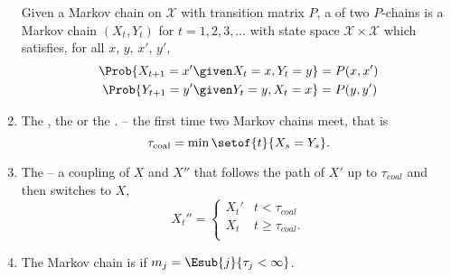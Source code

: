 \documentclass[12pt]{article}
\begin{document}
\begin{enumerate}
        Given a Markov chain on \( \mathcal{X} \) with transition matrix
        \( P \), a  of two \( P \)-chains is a
        Markov chain \( (X_t, Y_t) \) for \( t=1, 2, 3, \dots \) with
        state space \( \mathcal{X} \times \mathcal{X} \) which
        satisfies, for all \( x \), \( y \), \( x' \), \( y' \),
        \begin{align*}
            \Prob{X_{t+1} = x' \given X_t = x, Y_t = y} &= P(x,x') \\
            \Prob{Y_{t+1} = y' \given Y_t = y, X_t = x} &= P(y,y') \\
        \end{align*}
    \item
        The , the  or the
        .  -- the first time two Markov chains
        meet, that is
        \[
            \tau_{\text{coal}} = \min \setof{t}{X_s = Y_s}.
        \]
    \item
        The  -- a coupling of \( X \) and \(
        X'' \) that follows the path of \( X' \) up to \( \tau_{coal} \)
        and then switches to \( X \),
        \[
            X_t'' =
            \begin{cases}
                X_t' & t < \tau_{coal} \\
                X_t & t \ge \tau_{coal}.  \\
            \end{cases}
        \]
    \item
        The Markov chain is  if \( m_j = \Esub{j}
        {\tau_j < \infty} \).
\end{enumerate}

\hr
\end{document}
